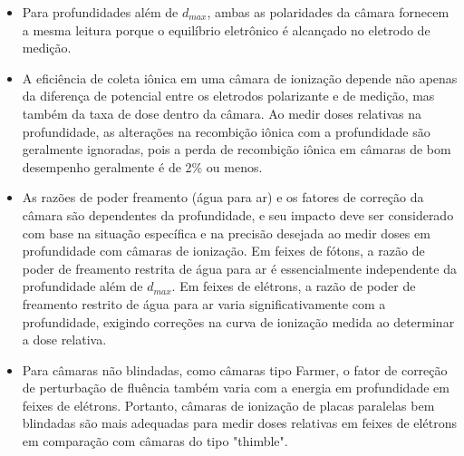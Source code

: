 \documentclass[11pt,a4paper]{article}
\newcounter{exemplo}
\begin{document}
\begin{exemplo}
\begin{itemize}
		\item Para profundidades além de  $d_{max}$, ambas as polaridades da câmara fornecem a mesma leitura porque o equilíbrio eletrônico é alcançado no eletrodo de medição.
		
		\item  A eficiência de coleta iônica em uma câmara de ionização depende não apenas da diferença de potencial entre os eletrodos polarizante e de medição, mas também da taxa de dose dentro da câmara. Ao medir doses relativas na profundidade, as alterações na recombição iônica com a profundidade são geralmente ignoradas, pois a perda de recombição iônica em câmaras de bom desempenho geralmente é de 2\% ou menos.
		
		\item \textcolor{DarkTurquoise}{\textbf{}} As razões de poder freamento (água para ar) e os fatores de correção da câmara são dependentes da profundidade, e seu impacto deve ser considerado com base na situação específica e na precisão desejada ao medir doses em profundidade com câmaras de ionização. Em feixes de fótons, a razão de poder de freamento restrita de água para ar é essencialmente independente da profundidade além de $d_{max}$. Em feixes de elétrons, a razão de poder de freamento restrito de água para ar varia significativamente com a profundidade, exigindo correções na curva de ionização medida ao determinar a dose relativa.
		
		\item Para câmaras não blindadas, como câmaras tipo Farmer, o fator de correção de perturbação de fluência também varia com a energia em profundidade em feixes de elétrons. Portanto, câmaras de ionização de placas paralelas bem blindadas são mais adequadas para medir doses relativas em feixes de elétrons em comparação com câmaras do tipo "thimble".
	\end{itemize}
\end{exemplo}


\pagebreak

\end{document}
